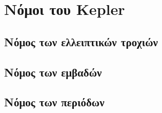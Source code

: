 \chapter{Νόμοι του Kepler}
\label{apx:kepler}

\section{Νόμος των ελλειπτικών τροχιών}

\section{Νόμος των εμβαδών}

\section{Νόμος των περιόδων}